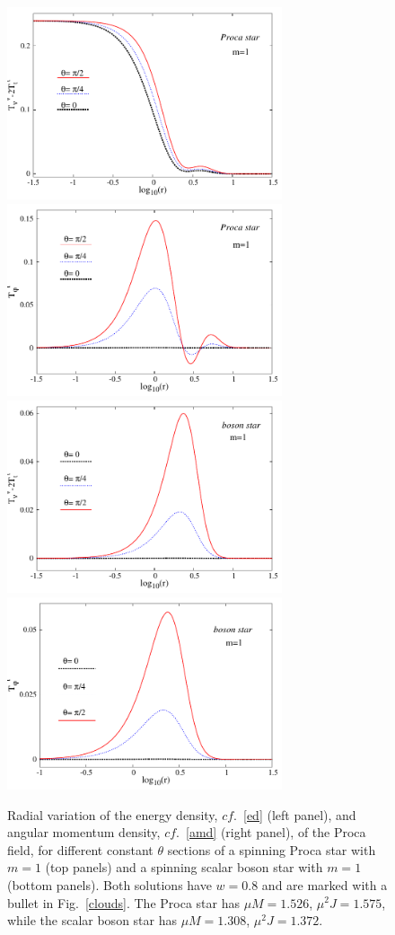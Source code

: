 \begin{figure}[h!]
  \begin{center}
    \includegraphics[width=8.1cm]{papers/Proca/PS-ro-m1.pdf}
    \includegraphics[width=8.1cm]{papers/Proca/PS-T34-m1.pdf}   
    \includegraphics[width=8.1cm]{papers/Proca/BS-ro-m1.pdf}
    \includegraphics[width=8.1cm]{papers/Proca/BS-T34-m1.pdf}
  \end{center}
 \caption{Radial variation of the energy density, $cf.$~\eqref{ed} (left panel), and angular momentum density, $cf.$~\eqref{amd}  (right panel),  of the Proca field, for different constant $\theta$ sections of a spinning Proca star with $m=1$ (top panels) and a spinning scalar boson star with $m=1$ (bottom panels). Both solutions have $w=0.8$ and are marked with a bullet in Fig.~\ref{clouds}. The Proca star has $\mu M= 1.526$,  $\mu^2J= 1.575$, while the scalar boson star has $\mu M=1.308$, $\mu^2J=1.372$.}
  \label{PS1}
\end{figure}



